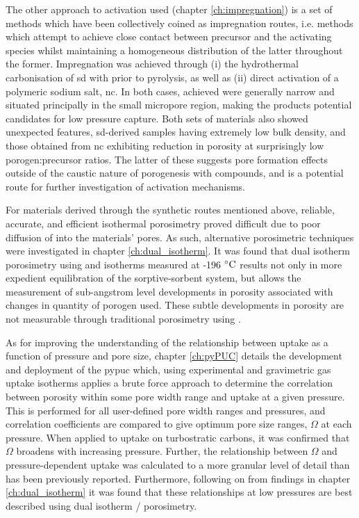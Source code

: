 The other approach to activation used (chapter \ref{ch:impregnation}) is a set of methods which have been collectively coined as impregnation routes, i.e. methods which attempt to achieve close contact between precursor and the activating species whilst maintaining a homogeneous distribution of the latter throughout the former. Impregnation was achieved through (i) the hydrothermal carbonisation of \acrfull{sd} with  prior to pyrolysis, as well as (ii) direct activation of a polymeric sodium salt, \acrfull{nc}. In both cases,  achieved were generally narrow and situated principally in the small \gls{micropore} region, making the products potential candidates for low pressure  capture. Both sets of materials also showed unexpected features, \acrshort{sd}-derived samples having extremely low bulk density, and those obtained from \acrshort{nc} exhibiting reduction in porosity at surprisingly low \gls{porogen}:precursor ratios. The latter of these suggests pore formation effects outside of the caustic nature of \gls{porogenesis} with  compounds, and is a potential route for further investigation of \gls{activation} mechanisms.

For materials derived through the synthetic routes mentioned above, reliable, accurate, and efficient isothermal porosimetry proved difficult due to poor diffusion of  into the materials' pores. As such, alternative porosimetric techniques were investigated in chapter \ref{ch:dual_isotherm}. It was found that dual isotherm porosimetry using  and  isotherms measured at -196 $\rm ^{\circ}C$ results not only in more expedient equilibration of the sorptive-sorbent system, but allows the measurement of sub-angstrom level developments in porosity associated with changes in quantity of \gls{porogen} used. These subtle developments in porosity are not measurable through traditional porosimetry using . 

As for improving the understanding of the relationship between  uptake as a function of pressure and pore size, chapter \ref{ch:pyPUC} details the development and deployment of the \acrfull{pypuc} which, using experimental  and gravimetric gas uptake isotherms applies a brute force approach to determine the correlation between porosity within some pore width range and  uptake at a given pressure. This is performed for all user-defined pore width ranges and pressures, and correlation coefficients are compared to give optimum pore size ranges, $\Omega$ at each pressure. When applied to  uptake on \glspl{turbostratic carbon}, it was confirmed that $\Omega$ broadens with increasing pressure. Further, the relationship between $\Omega$ and pressure-dependent  uptake was calculated to a more granular level of detail than has been previously reported. Furthermore, following on from findings in chapter \ref{ch:dual_isotherm} it was found that these relationships at low pressures are best described using dual isotherm / porosimetry.